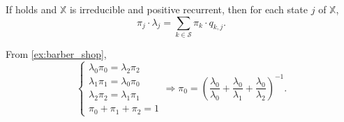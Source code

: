 \begin{theorem}
If  holds and $ \mathbb{X} $ is irreducible and positive recurrent, then for each state $ j $ of $ \mathbb{X} $,
\[ \pi_{j} \cdot \lambda_{j} = \sum_{k \in \mathcal{S}} \pi_{k} \cdot q_{k, j}. \]
\begin{comment}
可配合 $ \sum_{j \in \mathcal{S}} \pi_{j} = 1 $ 來解出 $ \boldsymbol\pi $。
\end{comment}
\begin{comment}
不嚴謹的說明：
\begin{eqnarray*}
0 & = & \lim_{t \to 0} p'_{i, j}(t) \\
  & = & \lim_{t \to 0} \left( \sum_{k \in \mathcal{S}} p_{i, k}(t) \cdot q_{k, j} - \lambda_{j} \cdot p_{i, j}(t) \right) \\
  & = & \sum_{k \in \mathcal{S}} \pi_{k} \cdot q_{k, j} - \lambda_{j} \cdot \pi_{j}.
\end{eqnarray*}
\end{comment}
\begin{comment}
Interpretation:
\begin{itemize}
  \item \textbf{L.H.S.}: Poisson rate of the process of leaving $ j $.
  \item \textbf{R.H.S.}: Poisson rate of the process of entering $ j $.
\end{itemize}
\end{comment}
\end{theorem}

\begin{example}
From \autoref{ex:barber_shop},
\[ \begin{cases}
\lambda_{0} \pi_{0} = \lambda_{2} \pi_{2} \\
\lambda_{1} \pi_{1} = \lambda_{0} \pi_{0} \\
\lambda_{2} \pi_{2} = \lambda_{1} \pi_{1} \\
\pi_{0} + \pi_{1} + \pi_{2} = 1
\end{cases} \Rightarrow \pi_{0} = \left( \frac{\lambda_{0}}{\lambda_{0}} + \frac{\lambda_{0}}{\lambda_{1}} + \frac{\lambda_{0}}{\lambda_{2}} \right)^{-1}. \]
\end{example}

